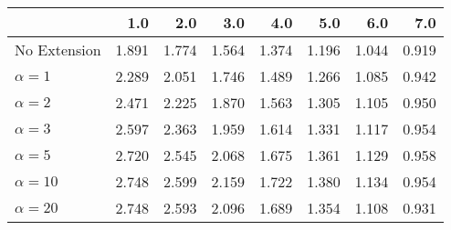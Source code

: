\begin{tabular}{lrrrrrrr}
\toprule
{} &   1.0 &   2.0 &   3.0 &   4.0 &   5.0 &   6.0 &   7.0 \\
\midrule
No Extension  & 1.891 & 1.774 & 1.564 & 1.374 & 1.196 & 1.044 & 0.919 \\
$\alpha = 1$  & 2.289 & 2.051 & 1.746 & 1.489 & 1.266 & 1.085 & 0.942 \\
$\alpha = 2$  & 2.471 & 2.225 & 1.870 & 1.563 & 1.305 & 1.105 & 0.950 \\
$\alpha = 3$  & 2.597 & 2.363 & 1.959 & 1.614 & 1.331 & 1.117 & 0.954 \\
$\alpha = 5$  & 2.720 & 2.545 & 2.068 & 1.675 & 1.361 & 1.129 & 0.958 \\
$\alpha = 10$ & 2.748 & 2.599 & 2.159 & 1.722 & 1.380 & 1.134 & 0.954 \\
$\alpha = 20$ & 2.748 & 2.593 & 2.096 & 1.689 & 1.354 & 1.108 & 0.931 \\
\bottomrule
\end{tabular}
